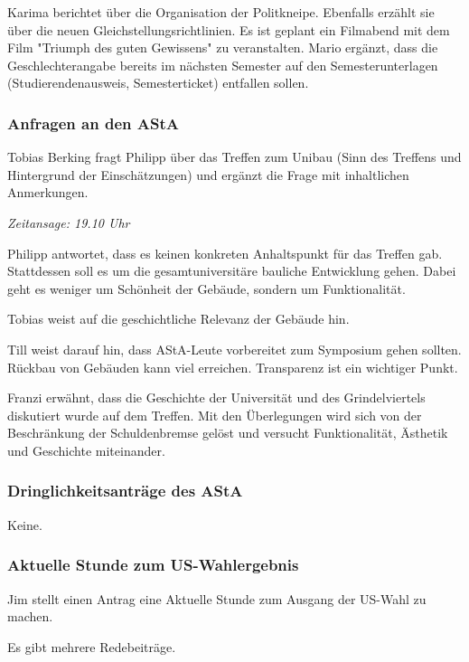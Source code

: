 \documentclass[ngerman,headheight=70pt]{scrartcl}
\begin{document}
    Karima berichtet über die Organisation der Politkneipe. Ebenfalls erzählt sie
    über die neuen Gleichstellungsrichtlinien. Es ist geplant ein Filmabend mit
    dem Film "Triumph des guten Gewissens" zu veranstalten.
    Mario ergänzt, dass die Geschlechterangabe bereits im nächsten Semester auf
    den Semesterunterlagen (Studierendenausweis, Semesterticket) entfallen
    sollen.

    \subsubsection{Anfragen an den AStA}

    Tobias Berking fragt Philipp über das Treffen zum Unibau (Sinn des Treffens
    und Hintergrund der Einschätzungen) und ergänzt die Frage
    mit inhaltlichen Anmerkungen.

    \textit{Zeitansage: 19.10 Uhr}

    Philipp antwortet, dass es keinen konkreten Anhaltspunkt für das Treffen gab.
    Stattdessen soll es um die gesamtuniversitäre bauliche Entwicklung gehen.
    Dabei geht es weniger um Schönheit der Gebäude, sondern um Funktionalität.

    Tobias weist auf die geschichtliche Relevanz der Gebäude hin.

    Till weist darauf hin, dass AStA-Leute vorbereitet zum Symposium gehen sollten.
    Rückbau von Gebäuden kann viel erreichen. Transparenz ist ein wichtiger Punkt.

    Franzi erwähnt, dass die Geschichte der Universität und des Grindelviertels
    diskutiert wurde auf dem Treffen. Mit den Überlegungen wird sich von der
    Beschränkung der Schuldenbremse gelöst und versucht Funktionalität, Ästhetik
    und Geschichte miteinander.

    \subsubsection{Dringlichkeitsanträge des AStA}

    Keine.

    \subsubsection{Aktuelle Stunde zum US-Wahlergebnis}

    Jim stellt einen Antrag eine Aktuelle Stunde zum Ausgang der US-Wahl zu machen.

    Es gibt mehrere Redebeiträge.
\end{document}
